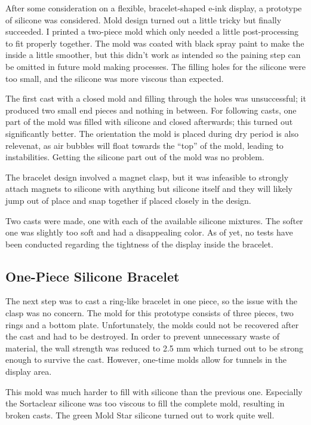 After some consideration on a flexible, bracelet-shaped e-ink display, a prototype of silicone was considered. Mold design turned out a little tricky but finally succeeded. I printed a two-piece mold which only needed a little post-processing to fit properly together. The mold was coated with black spray paint to make the inside a little smoother, but this didn't work as intended so the paining step can be omitted in future mold making processes. The filling holes for the silicone were too small, and the silicone was more viscous than expected.

The first cast with a closed mold and filling through the holes was unsuccessful; it produced two small end pieces and nothing in between. For following casts, one part of the mold was filled with silicone and closed afterwards; this turned out significantly better. The orientation the mold is placed during dry period is also relevenat, as air bubbles will float towards the ``top'' of the mold, leading to instabilities. Getting the silicone part out of the mold was no problem.

The bracelet design involved a magnet clasp, but it was infeasible to strongly attach magnets to silicone with anything but silicone itself and they will likely jump out of place and snap together if placed closely in the design.

Two casts were made, one with each of the available silicone mixtures. The softer one was slightly too soft and had a disappealing color. As of yet, no tests have been conducted regarding the tightness of the display inside the bracelet.

\subsection{One-Piece Silicone Bracelet}
The next step was to cast a ring-like bracelet in one piece, so the issue with the clasp was no concern. The mold for this prototype consists of three pieces, two rings and a bottom plate. Unfortunately, the molds could not be recovered after the cast and had to be destroyed. In order to prevent unnecessary waste of material, the wall strength was reduced to 2.5 mm which turned out to be strong enough to survive the cast. However, one-time molds allow for tunnels in the display area.

This mold was much harder to fill with silicone than the previous one. Especially the Sortaclear silicone was too viscous to fill the complete mold, resulting in broken casts. The green Mold Star silicone turned out to work quite well.

